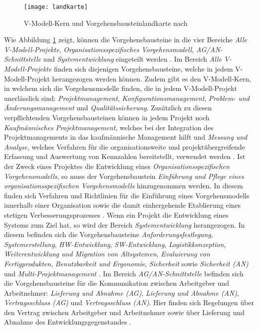 \begin{figure}[htp]
\begin{center}
  \texttt{[image: landkarte]} %
  \caption{V-Modell-Kern und Vorgehensbausteinlandkarte nach \cite{2004vmodell}}
  \label{fig:landkarte}
\end{center}
\end{figure}

 Wie Abbildung \ref{fig:landkarte} zeigt, können die Vorgehensbausteine in die vier Bereiche \textit{Alle V-Modell-Projekte}, \textit{Organisationsspezifisches Vorgehensmodell}, \textit{AG/AN-Schnittstelle} und \textit{Systementwicklung} eingeteilt werden \cite{2004vmodell}.\newline
 Im Bereich \textit{Alle V-Modell-Projekte} finden sich diejenigen Vorgehensbausteine, welche in jedem V-Modell-Projekt herangezogen werden können. Zudem gibt es den V-Modell-Kern, in welchem sich die Vorgehensmodelle finden, die in jedem V-Modell-Projekt unerlässlich sind: \textit{Projektmanagement}, \textit{Konfigurationsmanagement}, \textit{Problem- und Änderungsmanagement} und \textit{Qualitätssicherung}. Zusätzlich zu diesen verpflichtenden Vorgehensbausteinen können in jedem Projekt noch \textit{Kaufmännisches Projektmanagement}, welches bei der Integration des Projektmanagements in das kaufmännische Management hilft und \textit{Messung und Analyse}, welches Verfahren für die organisationsweite und projektübergreifende Erfassung und Auswertung von Kennzahlen bereitstellt, verwendet werden \cite{2004vmodell}.\newline
 Ist der Zweck eines Projektes die Entwicklung eines \textit{Organisationsspezifischen Vorgehensmodells}, so muss der Vorgehensbaustein \textit{Einführung und Pflege eines organisationsspezifischen Vorgehensmodells} hinzugenommen werden. In diesem finden sich Verfahren und Richtlinien für die Einführung eines Vorgehensmodells innerhalb einer Organisation sowie die damit einhergehende Etablierung eines stetigen Verbesserungsprozesses \cite{2004vmodell}.\newline
 Wenn ein Projekt die Entwicklung eines Systems zum Ziel hat, so wird der Bereich \textit{Systementwicklung} herangezogen. In diesem befinden sich die Vorgehensbausteine \textit{Anforderungsfestlegung}, \textit{Systemerstellung}, \textit{HW-Entwicklung}, \textit{SW-Entwicklung}, \textit{Logistikkonzeption}, \textit{Weiterentwicklung und Migration von Altsystemen}, \textit{Evaluierung von Fertigprodukten}, \textit{Benutzbarkeit und Ergonomie}, \textit{Sicherheit} sowie \textit{Sicherheit (AN)} und \textit{Multi-Projektmanagement} \cite{2004vmodell}. \newline
 Im Bereich \textit{AG/AN-Schnittstelle} befinden sich die Vorgehensbausteine für die Kommunikation zwischen Arbeitgeber und Arbeitnehmer: \textit{Lieferung und Abnahme (AG)}, \textit{Lieferung und Abnahme (AN)}, \textit{Vertragsschluss (AG)} und \textit{Vertragsschluss (AN)}. Hier finden sich Regelungen über den Vertrag zwischen Arbeitgeber und Arbeitnehmer sowie über Lieferung und Abnahme des Entwicklungsgegenstandes \cite{2004vmodell}. \newline
 
